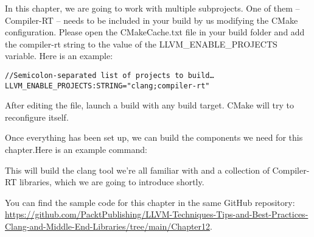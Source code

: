 In this chapter, we are going to work with multiple subprojects. One of them – Compiler-RT – needs to be included in your build by us modifying the CMake configuration. Please open the CMakeCache.txt file in your build folder and add the compiler-rt string to the value of the LLVM\_ENABLE\_PROJECTS variable. Here is an example:

\begin{lstlisting}[style=styleCMake]
//Semicolon-separated list of projects to build…
LLVM_ENABLE_PROJECTS:STRING="clang;compiler-rt"
\end{lstlisting}

After editing the file, launch a build with any build target. CMake will try to reconfigure itself.

Once everything has been set up, we can build the components we need for this chapter.Here is an example command:


This will build the clang tool we're all familiar with and a collection of Compiler-RT libraries, which we are going to introduce shortly.

You can find the sample code for this chapter in the same GitHub repository: \url{https://github.com/PacktPublishing/LLVM-Techniques-Tips-and-Best-Practices-Clang-and-Middle-End-Libraries/tree/main/Chapter12}.





















